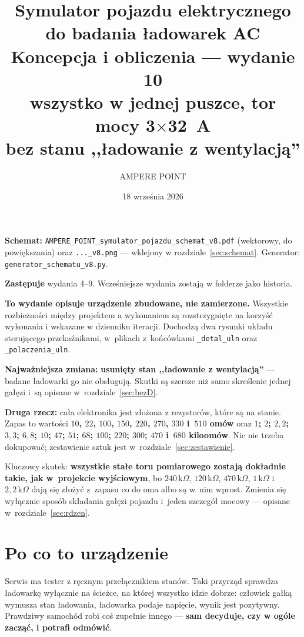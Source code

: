 \documentclass[a4paper,11pt]{article}
\title{\vspace{-1.5cm}Symulator pojazdu elektrycznego do badania ładowarek AC\\[2mm]
\large Koncepcja i obliczenia --- wydanie 10\\[1mm]
\normalsize wszystko w jednej puszce, tor mocy 3$\times$32~A\\[1mm]
\normalsize bez stanu ,,ładowanie z wentylacją''}
\author{AMPERE POINT}
\date{18 września 2026}
\newcommand{\kohm}{\,\mathrm{k}\Omega}
\begin{document}
\maketitle
\thispagestyle{empty}

\noindent\textbf{Schemat:} \texttt{AMPERE\_POINT\_symulator\_pojazdu\_schemat\_v8.pdf}
(wektorowy, do powiększania) oraz \texttt{...\_v8.png} --- wklejony w rozdziale~\ref{sec:schemat}.
Generator: \texttt{generator\_schematu\_v8.py}.

\noindent\textbf{Zastępuje} wydania 4--9. Wcześniejsze wydania zostają w folderze jako
historia.

\noindent\textbf{To wydanie opisuje urządzenie zbudowane, nie zamierzone.} Wszystkie
rozbieżności między projektem a wykonaniem są rozstrzygnięte na korzyść wykonania
i wskazane w dzienniku iteracji. Dochodzą dwa rysunki układu sterującego
przekaźnikami, w~plikach z~końcówkami \texttt{\_detal\_uln} oraz
\texttt{\_polaczenia\_uln}.

\noindent\textbf{Najważniejsza zmiana:} \textbf{usunięty stan ,,ładowanie z wentylacją''}
--- badane ładowarki go nie obsługują. Skutki są szersze niż samo skreślenie jednej gałęzi
i~są opisane w~rozdziale~\ref{sec:bezD}.

\noindent\textbf{Druga rzecz:} cała elektronika jest złożona z rezystorów, które
są na stanie. Zapas to wartości \textbf{$10$, $22$, $100$, $150$, $220$, $270$, $330$
i~$510$ omów} oraz \textbf{$1$; $2$; $2{,}2$; $3{,}3$; $6{,}8$; $10$; $47$; $51$; $68$;
$100$; $220$; $300$; $470$ i~$680$ kiloomów}. Nic nie trzeba dokupować; zestawienie sztuk
jest w~rozdziale~\ref{sec:zestawienie}.

\noindent Kluczowy skutek: \textbf{wszystkie stałe toru pomiarowego zostają dokładnie takie,
jak w~projekcie wyjściowym}, bo $240\kohm$, $120\kohm$, $470\kohm$, $1\kohm$ i~$2{,}2\kohm$
dają się złożyć z~zapasu co do oma albo są w~nim wprost. Zmienia się wyłącznie sposób
składania gałęzi pojazdu i~jeden szczegół mocowy --- opisane w~rozdziale~\ref{sec:rdzen}.

\tableofcontents

\section{Po co to urządzenie}

Serwis ma tester z ręcznym przełącznikiem stanów. Taki przyrząd sprawdza ładowarkę
wyłącznie na ścieżce, na której wszystko idzie dobrze: człowiek gałką wymusza stan
ładowania, ładowarka podaje napięcie, wynik jest pozytywny. Prawdziwy samochód robi
coś zupełnie innego --- \textbf{sam decyduje, czy w ogóle zacząć, i potrafi odmówić}.
\end{document}
